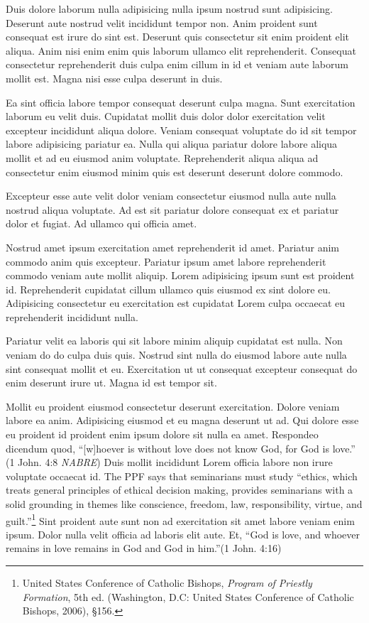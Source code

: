 \documentclass[
    12pt,
    letterpaper,
    oneside,
    noraggedright
]{turabian-researchpaper}
\begin{document}
Duis dolore laborum nulla adipisicing nulla ipsum nostrud sunt
adipisicing. Deserunt aute nostrud velit incididunt tempor non. Anim
proident sunt consequat est irure do sint est. Deserunt quis consectetur
sit enim proident elit aliqua. Anim nisi enim enim quis laborum ullamco
elit reprehenderit. Consequat consectetur reprehenderit duis culpa enim
cillum in id et veniam aute laborum mollit est. Magna nisi esse culpa
deserunt in duis.

Ea sint officia labore tempor consequat deserunt culpa magna. Sunt
exercitation laborum eu velit duis. Cupidatat mollit duis dolor dolor
exercitation velit excepteur incididunt aliqua dolore. Veniam consequat
voluptate do id sit tempor labore adipisicing pariatur ea. Nulla qui
aliqua pariatur dolore labore aliqua mollit et ad eu eiusmod anim
voluptate. Reprehenderit aliqua aliqua ad consectetur enim eiusmod minim
quis est deserunt deserunt dolore commodo.

Excepteur esse aute velit dolor veniam consectetur eiusmod nulla aute
nulla nostrud aliqua voluptate. Ad est sit pariatur dolore consequat ex
et pariatur dolor et fugiat. Ad ullamco qui officia amet.

Nostrud amet ipsum exercitation amet reprehenderit id amet. Pariatur
anim commodo anim quis excepteur. Pariatur ipsum amet labore
reprehenderit commodo veniam aute mollit aliquip. Lorem adipisicing
ipsum sunt est proident id. Reprehenderit cupidatat cillum ullamco quis
eiusmod ex sint dolore eu. Adipisicing consectetur eu exercitation est
cupidatat Lorem culpa occaecat eu reprehenderit incididunt nulla.

Pariatur velit ea laboris qui sit labore minim aliquip cupidatat est
nulla. Non veniam do do culpa duis quis. Nostrud sint nulla do eiusmod
labore aute nulla sint consequat mollit et eu. Exercitation ut ut
consequat excepteur consequat do enim deserunt irure ut. Magna id est
tempor sit.

Mollit eu proident eiusmod consectetur deserunt exercitation. Dolore
veniam labore ea anim. Adipisicing eiusmod et eu magna deserunt ut ad.
Qui dolore esse eu proident id proident enim ipsum dolore sit nulla ea
amet. Respondeo dicendum quod, ``{[}w{]}hoever is without love does not
know God, for God is love.'' (1 John. 4:8{ \emph{NABRE}}) Duis mollit
incididunt Lorem officia labore non irure voluptate occaecat id. The PPF
says that seminarians must study ``ethics, which treats general
principles of ethical decision making, provides seminarians with a solid
grounding in themes like conscience, freedom, law, responsibility,
virtue, and guilt.''\footnote{United States Conference of Catholic
  Bishops, \emph{Program of Priestly Formation}, 5th ed. (Washington,
  D.C: United States Conference of Catholic Bishops, 2006), §156.} Sint
proident aute sunt non ad exercitation sit amet labore veniam enim
ipsum. Dolor nulla velit officia ad laboris elit aute. Et, ``God is
love, and whoever remains in love remains in God and God in
him.''(1 John. 4:16)
\end{document}
